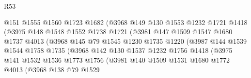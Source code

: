 \begin{lexlean}{R53}
\begin{coremodule}
                            @151
                            @1555
                            @1560
                            @1723
                            @1682
                            (@3968
                              @149
                              @130
                              @1553
                              @1232
                              @1721
                              @1418
                              (@3975
                                @148
                                @1548
                                @1552
                                @1738
                                @1721
                                (@3981
                                  @147
                                  @1509
                                  @1547
                                  @1680
                                  @1737
                                  @4013
                                  (@3968
                                    @145
                                    @79
                                    @1545
                                    @1230
                                    @1735
                                    @1220
                                    (@3987
                                      @144
                                      @1539
                                      @1544
                                      @1758
                                      @1735
                                      (@3968
                                        @142
                                        @130
                                        @1537
                                        @1232
                                        @1756
                                        @1418
                                        (@3975
                                          @141
                                          @1532
                                          @1536
                                          @1773
                                          @1756
                                          (@3981
                                            @140
                                            @1509
                                            @1531
                                            @1680
                                            @1772
                                            @4013
                                            (@3968
                                              @138
                                              @79
                                              @1529

\end{coremodule}
\end{lexlean}
